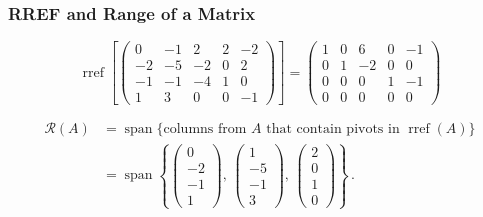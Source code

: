 \documentclass[xcolor=table]{beamer}
\newcommand{\range}{\mathcal{R}}
\DeclareMathOperator{\spann}{span}
\DeclareMathOperator{\rref}{rref}
\begin{document}
	\begin{frame}
		\frametitle{RREF and Range of a Matrix}
		\begin{equation*}
			\rref\left[\begin{pmatrix}
				 0 & -1 &  2 & 2 & -2\\
				-2 & -5 & -2 & 0 &  2\\
				-1 & -1 & -4 & 1 &  0\\
				 1 &  3 &  0 & 0 & -1
			\end{pmatrix}\right]=\begin{pmatrix}
				1 & 0 &  6 & 0 & -1\\
				0 & 1 & -2 & 0 &  0\\
				0 & 0 &  0 & 1 & -1\\
				0 & 0 &  0 & 0 &  0
			\end{pmatrix}
		\end{equation*}
		
		\begin{align*}
			\range(A) & =\spann\{\text{columns from }A\text{ that contain pivots in }\rref(A)\}\\
			& =\spann\left\{\begin{pmatrix}0\\-2\\-1\\1\end{pmatrix},\,\begin{pmatrix}1\\-5\\-1\\3\end{pmatrix},\,\begin{pmatrix}2\\0\\1\\0\end{pmatrix}\right\}\,.
		\end{align*}
	\end{frame}
	
\end{document}
